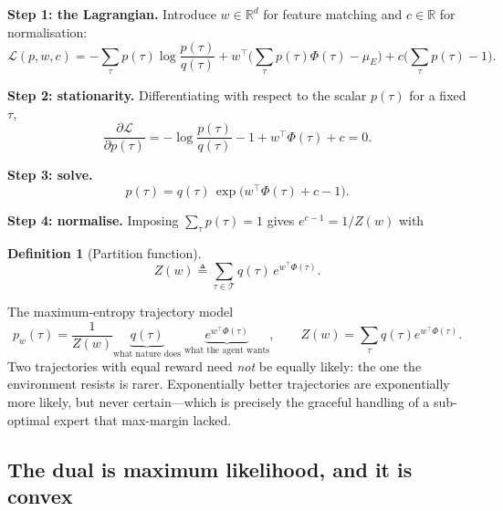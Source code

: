 \documentclass[11pt]{article}
\theoremstyle{plain}
\theoremstyle{definition}
\newtheorem{definition}[theorem]{Definition}
\theoremstyle{remark}
\newcommand{\T}{\mathcal{T}}
\newcommand{\R}{\mathbb{R}}
\begin{document}
\textbf{Step 1: the Lagrangian.} Introduce $w\in\R^d$ for feature matching
and $c\in\R$ for normalisation:
\begin{equation}
\mathcal{L}(p,w,c) = -\sum_\tau p(\tau)\log\frac{p(\tau)}{q(\tau)}
+ w^\top\Big(\sum_\tau p(\tau)\Phi(\tau) - \mu_E\Big)
+ c\Big(\sum_\tau p(\tau) - 1\Big).
\label{eq:maxentlagrangian}
\end{equation}

\textbf{Step 2: stationarity.} Differentiating with respect to the scalar
$p(\tau)$ for a fixed $\tau$,
\begin{equation}
\frac{\partial \mathcal{L}}{\partial p(\tau)} = -\log\frac{p(\tau)}{q(\tau)}
- 1 + w^\top\Phi(\tau) + c = 0.
\label{eq:maxentstationarity}
\end{equation}

\textbf{Step 3: solve.}
\begin{equation}
p(\tau) = q(\tau)\,\exp\big(w^\top\Phi(\tau) + c - 1\big).
\label{eq:maxentsolve}
\end{equation}

\textbf{Step 4: normalise.} Imposing $\sum_\tau p(\tau)=1$ gives
$e^{c-1} = 1/Z(w)$ with

\begin{definition}[Partition function]
\begin{equation}
Z(w) \triangleq \sum_{\tau\in\T} q(\tau)\,e^{w^\top\Phi(\tau)}.
\label{eq:partitionfn}
\end{equation}
\end{definition}

\begin{graybox}{The maximum-entropy trajectory model}
\begin{equation}
p_w(\tau) = \frac{1}{Z(w)} \underbrace{q(\tau)}_{\text{what nature does}}
\;\underbrace{e^{w^\top\Phi(\tau)}}_{\text{what the agent wants}}, \qquad
Z(w) = \sum_\tau q(\tau)e^{w^\top\Phi(\tau)}.
\label{eq:maxentmodel}
\end{equation}
Two trajectories with equal reward need \emph{not} be equally likely: the
one the environment resists is rarer. Exponentially better trajectories
are exponentially more likely, but never certain---which is precisely the
graceful handling of a sub-optimal expert that max-margin lacked.
\end{graybox}

\subsection{The dual is maximum likelihood, and it is convex}
\end{document}

